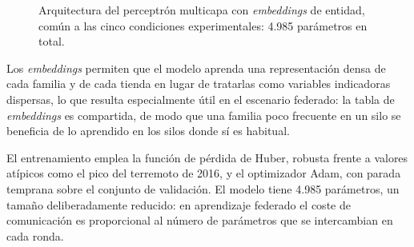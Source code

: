 \begin{figure}[H]
  \centering
  \caption[Arquitectura del modelo]{Arquitectura del perceptrón multicapa con \emph{embeddings} de
  entidad, común a las cinco condiciones experimentales: 4.985 parámetros en total.}
  \label{fig:arquitectura_mlp}
\end{figure}

Los \emph{embeddings} permiten que el modelo aprenda una representación densa de cada familia y de
cada tienda en lugar de tratarlas como variables indicadoras dispersas, lo que resulta
especialmente útil en el escenario federado: la tabla de \emph{embeddings} es compartida, de modo
que una familia poco frecuente en un silo se beneficia de lo aprendido en los silos donde sí es
habitual.

El entrenamiento emplea la función de pérdida de Huber, robusta frente a valores atípicos como el
pico del terremoto de 2016, y el optimizador Adam, con parada temprana sobre el conjunto de
validación. El modelo tiene 4.985 parámetros, un tamaño deliberadamente reducido: en aprendizaje
federado el coste de comunicación es proporcional al número de parámetros que se intercambian en
cada ronda.

